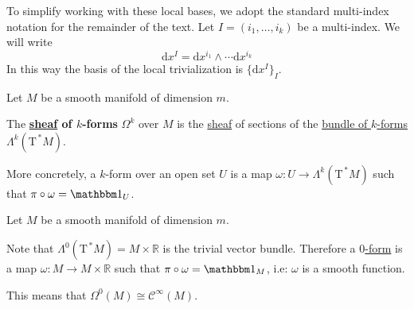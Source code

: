 \documentclass[../../main]{subfiles}
\begin{document}
\begin{notation}
  To simplify working with these local bases, we adopt the standard multi-index notation for the remainder of the text.
  Let \(I = (i_{1}, \ldots, i_{k})\) be a multi-index.
  We will write
  \begin{equation*}
    \mathrm{d}x^{I} = \mathrm{d}x^{i_{1}} \wedge \cdots \mathrm{d}x^{i_{k}}
  \end{equation*}
  In this way the basis of the local trivialization is \(\{\mathrm{d}x^{I}\}_{I}\).
\end{notation}

\begin{definition} \label{def:smooth-k-form}
  Let \(M\) be a smooth manifold of dimension \(m\).

  The \textbf{\hyperref[def:sheaf]{sheaf} of \(k\)-forms} \(\Omega^{k}\) over \(M\) is the \hyperref[def:sheaf]{sheaf} of sections of the \hyperref[def:smooth-k-form-bundle]{bundle of \(k\)-forms} \(\Lambda^{k}(\mathrm{T}^{\,\ast}M)\).

  More concretely, a \(k\)-form over an open set \(U\) is a map \(\omega: U \to \Lambda^{k}(\mathrm{T}^{\,\ast}M)\) such that \(\pi \circ \omega = \id_{U}\).
\end{definition}

\begin{example}
  Let \(M\) be a smooth manifold of dimension \(m\).

  Note that \(\Lambda^{0}(\mathrm{T}^{\,\ast}M) = M \times \mathbb{R}\) is the trivial vector bundle.
  Therefore a \hyperref[def:smooth-k-form]{\(0\)-form} is a map \(\omega: M \to M \times \mathbb{R}\) such that \(\pi \circ \omega = \id_{M}\), i.e: \(\omega\) is a smooth function.

  This means that \(\Omega^{0}(M) \cong \mathcal{C}^{\infty}(M)\).
\end{example}
\end{document}
